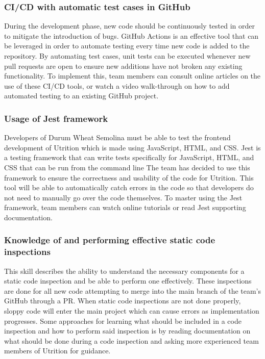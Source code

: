 \documentclass[12pt, titlepage]{article}
\begin{document}
	\subsubsection*{CI/CD with automatic test cases in GitHub}
	
	During the development phase, new code should be continuously tested in 
	order to mitigate the introduction of bugs. GitHub Actions is an effective 
	tool that can be leveraged in order to automate testing every time new 
	code is added to the repository. By automating test cases, unit tests can 
	be executed whenever new pull requests are open to ensure new additions 
	have not broken any existing functionality. To implement this, team members 
	can consult online articles on the use of these CI/CD tools, or watch a 
	video walk-through on how to add automated testing to an existing GitHub 
	project.
	
	\subsubsection*{Usage of Jest framework} 
	Developers of Durum Wheat Semolina must be able to test the frontend development of Utrition which is made using JavaScript, HTML, and CSS. Jest is a testing framework that can write tests specifically for JavaScript, HTML, and CSS that can be run from the command line The team has decided to use this framework to ensure the correctness and usability of the code for Utrition. This tool will be able to automatically catch errors in the code so that developers do not need to manually go over the code themselves. To master using the Jest framework, team members can watch online tutorials or read Jest supporting documentation.
	
	\subsubsection*{Knowledge of and performing effective static code inspections}
	This skill describes the ability to understand the necessary components for a static code inspection and be able to perform one effectively. These inspections are done for all new code attempting to merge into the main branch of the team's GitHub through a PR. When static code inspections are not done properly, sloppy code will enter the main project which can cause errors as implementation progresses. Some approaches for learning what should be included in a code inspection and how to perform said inspection is by reading documentation on what should be done during a code inspection and asking more experienced team members of Utrition for guidance.
	
\end{document}
